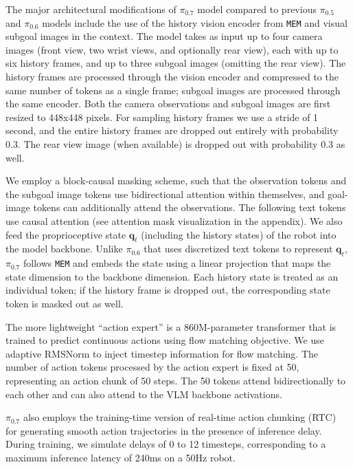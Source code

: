 \documentclass[conference]{IEEEtran}
\newcommand{\bq}{\mathbf{q}}
\def \Pizf {$\pi_{0.5}$}
\def \Pizs {$\pi_{0.6}$}
\def \MethodName {$\pi_{0.7}$}
\begin{document}
The major architectural modifications of \MethodName{} model compared to previous \Pizf{} and \Pizs{} models include the use of the history vision encoder from \texttt{MEM} \cite{torne2026mem} and visual subgoal images in the context.
The model takes as input up to four camera images (front view, two wrist views, and optionally rear view), each with up to six history frames, and up to three subgoal images (omitting the rear view). The history frames are processed through the vision encoder and compressed to the same number of tokens as a single frame; subgoal images are processed through the same encoder. Both the camera observations and subgoal images are first resized to 448x448 pixels.
For sampling history frames we use a stride of 1 second, 
and the entire history frames are dropped out entirely with probability 0.3. The rear view image (when available) is dropped out with probability 0.3 as well.

We employ a block-causal masking scheme, such that the observation tokens and the subgoal image tokens use bidirectional attention within themselves, and goal-image tokens can additionally attend the observations. The following text tokens use causal attention
(see attention mask visualization in the appendix). We also feed the proprioceptive state $\bq_t$ (including the history states) of the robot into the model backbone. Unlike \Pizs{} that uses discretized text tokens to represent $\bq_t$, \MethodName{} follows \texttt{MEM} and embeds the state using a linear projection that maps the state dimension to the backbone dimension. Each history state is treated as an individual token; if the history frame is dropped out, the corresponding state token is masked out as well.

The more lightweight ``action expert'' is a 860M-parameter transformer that is trained to predict continuous actions using flow matching objective. We use adaptive RMSNorm to inject timestep information for flow matching. The number of action tokens processed by the action expert is fixed at 50, representing an action chunk of 50 steps. The 50 tokens attend bidirectionally to each other and can also attend to the VLM backbone activations.

\MethodName{} also employs the training-time version of real-time action chunking (RTC)~\cite{black2025real,black2025ttrtc} for generating smooth action trajectories in the presence of inference delay. During training, we simulate delays of 0 to 12 timesteps, corresponding to a maximum inference latency of 240ms on a 50Hz robot.
\end{document}
